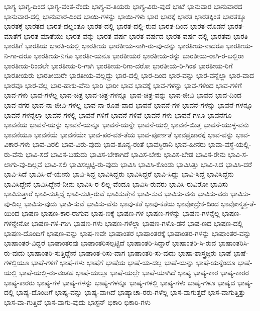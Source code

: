 {ಭಾಗ್ಯ
ಭಾಗ್ಯ-ದಿಂದ
ಭಾಗ್ಯ-ವಂತ-ನೆಂದು
ಭಾಗ್ಯ-ವ-ತಿಯರು
ಭಾಗ್ಯ-ವಿರು-ವುದೆ
ಭಾಟೆ
ಭಾನುವಾರ
ಭಾನುವಾರದ
ಭಾನುವಾರ-ದಲ್ಲಿ
ಭಾನುವಾರ-ದಿಂದ
ಭಾಯಿ-ಗಳನ್ನು
ಭಾಯಿ-ಗಳು
ಭಾರ
ಭಾರಕ್ಕೆ
ಭಾರತ
ಭಾರತಕ್ಕಿಂತ
ಭಾರತಕ್ಕೂ
ಭಾರತಕ್ಕೆ
ಭಾರತದ
ಭಾರತ-ದಲ್ಲಂತೂ
ಭಾರತ-ದಲ್ಲಿ
ಭಾರತ-ದಲ್ಲಿ-ರುವ
ಭಾರತ-ದಿಂದ
ಭಾರತ-ದೊಡನೆ
ಭಾರತ-ಮಾತೆಗೆ
ಭಾರತ-ಮಾತೆಯು
ಭಾರತ-ವನ್ನು
ಭಾರತ-ವರ್ಷ
ಭಾರತ-ವರ್ಷದ
ಭಾರತ-ವರ್ಷ-ದಲ್ಲಿ
ಭಾರತವು
ಭಾರತಿ
ಭಾರತಿಗೆ
ಭಾರತಿಯ
ಭಾರತಿ-ಯಲ್ಲಿ
ಭಾರತೀಯ
ಭಾರತೀಯ-ನಾಗಿ-ರು-ವು-ದನ್ನು
ಭಾರತೀಯ-ನಾದರೂ
ಭಾರತೀಯ-ನಿ-ಗಾ-ದರೂ
ಭಾರತೀಯ-ನಿಗೂ
ಭಾರತೀ-ಯನೂ
ಭಾರತೀಯರ
ಭಾರತೀಯ-ರನ್ನು
ಭಾರತೀಯ-ರಾಗಿ-ರ-ಬಲ್ಲಿರಾ
ಭಾರತೀಯ-ರಿಂದಲೇ
ಭಾರತೀಯ-ರಿ-ಗಾಗಿ
ಭಾರತೀಯ-ರಿಗಾ-ದರೋ
ಭಾರತೀಯ-ರಿ-ಗಿಂತ
ಭಾರತೀಯ-ರಿಗೆ
ಭಾರತೀಯರು
ಭಾರತೀಯರೇ
ಭಾರತೀಯ-ವಲ್ಲದ್ದು
ಭಾರ-ದಲ್ಲಿ
ಭಾರ-ದಿಂದ
ಭಾರ-ವನ್ನು
ಭಾರ-ವನ್ನೆಲ್ಲಾ
ಭಾರ-ವಾದ
ಭಾರವೂ
ಭಾರ-ವೆಲ್ಲ
ಭಾರ-ಹಾಕು-ವೆನು
ಭಾರಿ
ಭಾರೀ
ಭಾವ
ಭಾವಕ್ಕೆ
ಭಾವ-ಗಳನ್ನು
ಭಾವ-ಗಳಿಂದ
ಭಾವ-ಗಳಿಗೆ
ಭಾವ-ಗಳು
ಭಾವ-ಗಳೆಲ್ಲ
ಭಾವ-ಚಿತ್ರ
ಭಾವ-ಚಿತ್ರ-ಗಳನ್ನೂ
ಭಾವ-ಚಿತ್ರ-ವನ್ನು
ಭಾವ-ಜೀವಿ
ಭಾವದ
ಭಾವ-ದಿಂದ
ಭಾವ-ನಗರ
ಭಾವ-ನಾ-ಜೀವಿ-ಗಳಲ್ಲ
ಭಾವ-ನಾ-ರೂಪ-ವಾದ
ಭಾವನೆ
ಭಾವನೆ-ಗಳ
ಭಾವನೆ-ಗಳನ್ನು
ಭಾವನೆ-ಗಳನ್ನೂ
ಭಾವನೆ-ಗಳನ್ನೆಲ್ಲಾ
ಭಾವನೆ-ಗಳಲ್ಲಿ
ಭಾವನೆ-ಗಳಿಗೆ
ಭಾವನೆ-ಗಳಿವೆ
ಭಾವನೆ-ಗಳು
ಭಾವನೆ-ಗಳೂ
ಭಾವನೆಗೂ
ಭಾವನೆಯ
ಭಾವನೆ-ಯನ್ನು
ಭಾವನೆ-ಯನ್ನೂ
ಭಾವನೆ-ಯನ್ನೇ
ಭಾವನೆ-ಯಲ್ಲಿ
ಭಾವನೆ-ಯಿತ್ತ
ಭಾವನೆ-ಯುಳ್ಳ-ವನು
ಭಾವನೆಯೂ
ಭಾವನೆಯೆ
ಭಾವನೆಯೇ
ಭಾವ-ಪರ-ವಶ-ತೆಯ
ಭಾವ-ಪೂರ್ಣತೆ
ಭಾವಪ್ರಚಾರಕ್ಕೆ
ಭಾವ-ವನ್ನು
ಭಾವ-ವಿಕಾರ-ಗಳು
ಭಾವ-ವಿರಲಿ
ಭಾವ-ವಿರು-ವುದು
ಭಾವ-ಶೂನ್ಯ-ರಂತೆ
ಭಾವಸ್ಥಿರಾನಿ
ಭಾವ-ಹೀನರು
ಭಾವಾ-ವಸ್ಥೆ-ಯಲ್ಲಿ-ರು-ವೆನು
ಭಾವಿ-ಸದೆ
ಭಾವಿಸ-ಬಹುದು
ಭಾವಿಸ-ಬೇಕಾಗಿದೆ
ಭಾವಿಸ-ಬೇಕು
ಭಾವಿಸ-ಬೇಡ
ಭಾವಿಸ-ರೇನು
ಭಾವಿ-ಸ-ಲಾಗು-ವು-ದಿಲ್ಲವೆ
ಭಾವಿ-ಸಲಿ
ಭಾವಿಸಲ್ಪಟ್ಟಿ-ರು-ವುದು
ಭಾವಿಸಿ
ಭಾವಿಸಿ-ಕೊಂಡು
ಭಾವಿಸಿತ್ತು
ಭಾವಿ-ಸಿದ
ಭಾವಿಸಿ-ದರೆ
ಭಾವಿ-ಸಿದೆ
ಭಾವಿಸಿ-ದೆ-ಯೇನು
ಭಾವಿ-ಸಿದ್ದ
ಭಾವಿಸಿದ್ದರು
ಭಾವಿಸಿದ್ದರೆ
ಭಾವಿ-ಸಿದ್ದು
ಭಾವಿ-ಸಿದ್ದೆ
ಭಾವಿಸಿದ್ದೆನು
ಭಾವಿಸಿದ್ದೇನೆ
ಭಾವಿಸಿದ್ದೇನೆ-ನೀನು
ಭಾವಿಸಿ-ರ-ಲಿಲ್ಲ-ವೆಂದೂ
ಭಾವಿಸಿ-ರುವರು
ಭಾವಿಸಿ-ರುವಿರೋ
ಭಾವಿಸು
ಭಾವಿಸುತ್ತಾರೆ
ಭಾವಿ-ಸುತ್ತಿದ್ದೆ
ಭಾವಿ-ಸುತ್ತಿ-ರುವೆ
ಭಾವಿಸುತ್ತೇನೆ
ಭಾವಿ-ಸುವ
ಭಾವಿಸು-ವನು
ಭಾವಿಸು-ವರು
ಭಾವಿಸು-ವು-ದಿಲ್ಲ
ಭಾವಿಸು-ವುದು
ಭಾವಿ-ಸುವೆ
ಭಾವಿಸು-ವೆನು
ಭಾವು-ಕತೆ
ಭಾವು-ಕತೆಯ
ಭಾವೋದ್ರೇಕ-ದಿಂದ
ಭಾವೋನ್ಮತ್ತ-ತೆ-ಯಿಂದ
ಭಾಷಣ
ಭಾಷಣ-ಕಾರ-ರಾಗುವ
ಭಾಷ-ಣಕ್ಕೆ
ಭಾಷಣ-ಗಳ
ಭಾಷಣ-ಗಳನ್ನು
ಭಾಷಣ-ಗಳನ್ನೆಲ್ಲ
ಭಾಷಣ-ಗಳನ್ನೇನೋ
ಭಾಷಣ-ಗಳಿ-ಗಾಗಿ
ಭಾಷಣ-ಗಳು
ಭಾಷಣ-ಗಳೆಲ್ಲಾ
ಭಾಷಣ-ಗಳೊ-ಡನೆ
ಭಾಷ-ಣದ
ಭಾಷಣ-ದಲ್ಲಿ
ಭಾಷಣ-ದೊಂದಿಗೆ
ಭಾಷಣ-ವನ್ನು
ಭಾಷ-ಣವೇ
ಭಾಷಾಂತರ
ಭಾಷಾಂತರಕ್ಕೆ
ಭಾಷಾಂತರ-ಗಳನ್ನು
ಭಾಷಾಂತರ-ವನ್ನು
ಭಾಷಾಂತರ-ವಿದ್ದರೆ
ಭಾಷಾಂತರವು
ಭಾಷಾಂತರಿಸಲ್ಪಟ್ಟಿದೆ
ಭಾಷಾಂತರಿ-ಸಿದ್ದಾರೆ
ಭಾಷಾಂತರಿ-ಸಿ-ರುವ
ಭಾಷಾಂತರಿಸಿ-ರು-ವುದು
ಭಾಷಾಂತರಿ-ಸುತ್ತಿದ್ದೇನೆ
ಭಾಷಾಂತ-ರಿಸು-ವಾಗ
ಭಾಷಾಂತರಿ-ಸು-ವುದು
ಭಾಷಾ-ಶಾಸ್ತ್ರಜ್ಞರು
ಭಾಷೆ
ಭಾಷೆ-ಗಳಲ್ಲಿಯೂ
ಭಾಷೆ-ಗಳಿಗೆ
ಭಾಷೆ-ಗಳು
ಭಾಷೆಗೆ
ಭಾಷೆಯ
ಭಾಷೆ-ಯ-ದಲ್ಲ
ಭಾಷೆ-ಯನ್ನು
ಭಾಷೆ-ಯನ್ನೆಂದೂ
ಭಾಷೆ-ಯಲ್ಲಿ
ಭಾಷೆ-ಯಲ್ಲಿ-ರು-ವಂತಹ
ಭಾಷೆ-ಯಲ್ಲೂ
ಭಾಷೆ-ಯಲ್ಲೇ
ಭಾಷೆ-ಯಾಗಿದೆ
ಭಾಷ್ಯ
ಭಾಷ್ಯ-ಕಾರ
ಭಾಷ್ಯ-ಕಾರರ
ಭಾಷ್ಯ-ಕಾರರು
ಭಾಷ್ಯ-ಗಳ
ಭಾಷ್ಯ-ಗಳನ್ನು
ಭಾಷ್ಯ-ಗಳನ್ನೂ
ಭಾಷ್ಯ-ಗಳಲ್ಲಿ
ಭಾಷ್ಯ-ಗಳು
ಭಾಷ್ಯ-ಗಳೂ
ಭಾಷ್ಯದ
ಭಾಷ್ಯ-ದಲ್ಲಿ
ಭಾಷ್ಯ-ದೊಂದಿಗೆ
ಭಾಷ್ಯ-ವನ್ನು
ಭಾಷ್ಯ-ವಾಗಿದೆ
ಭಾಷ್ಯಾಚಾ-ರರು-ಗಳೆಲ್ಲ
ಭಾಸ-ವಾಗುತ್ತದೆ
ಭಾಸ-ವಾಗುತ್ತಿತ್ತು
ಭಾಸ-ವಾ-ಗುತ್ತಿದೆ
ಭಾಸ-ವಾಗು-ವುದು
ಭಾಸ್ಟನ್
ಭಿಕಾರಿ
ಭಿಕಾರಿ-ಗಳು
}
